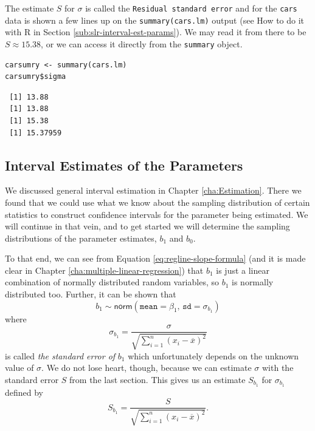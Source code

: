 \documentclass[captions=tableheading]{scrbook}
\begin{document}
The estimate \(S\) for \(\sigma\) is called the \texttt{Residual standard error} and for the \texttt{cars} data is shown a few lines up on the \texttt{summary(cars.lm)} output (see How to do it with \textsf{R} in Section \ref{sub:slr-interval-est-params}). We may read it from there to be \( S\approx  15.38 \), or we can access it directly from the \texttt{summary} object.


\begin{verbatim}
carsumry <- summary(cars.lm)
carsumry$sigma
\end{verbatim}

\begin{verbatim}
 [1] 13.88
 [1] 13.88
 [1] 15.38
 [1] 15.37959
\end{verbatim}
\subsection{Interval Estimates of the Parameters}
\label{sec-1-2-4}

\label{sub:slr-interval-est-params}

We discussed general interval estimation in Chapter \ref{cha:Estimation}. There we found that we could use what we know about the sampling distribution of certain statistics to construct confidence intervals for the parameter being estimated. We will continue in that vein, and to get started we will determine the sampling distributions of the parameter estimates, \(b_{1}\) and \(b_{0}\).

To that end, we can see from Equation \ref{eq:regline-slope-formula} (and it is made clear in Chapter \ref{cha:multiple-linear-regression}) that \(b_{1}\) is just a linear combination of normally distributed random variables, so \(b_{1}\) is normally distributed too. Further, it can be shown that
\begin{equation}
b_{1}\sim\mathsf{norm}\left(\mathtt{mean}=\beta_{1},\,\mathtt{sd}=\sigma_{b_{1}}\right)
\end{equation}
where
\begin{equation}
\sigma_{b_{1}}=\frac{\sigma}{\sqrt{\sum_{i=1}^{n}(x_{i}-\overline{x})^{2}}}
\end{equation}
is called \emph{the standard error of} \(b_{1}\) which unfortunately depends on the unknown value of \(\sigma\). We do not lose heart, though, because we can estimate \(\sigma\) with the standard error \(S\) from the last section. This gives us an estimate \(S_{b_{1}}\) for \(\sigma_{b_{1}}\) defined by
\begin{equation}
S_{b_{1}}=\frac{S}{\sqrt{\sum_{i=1}^{n}(x_{i}-\overline{x})^{2}}}.
\end{equation}
\end{document}
